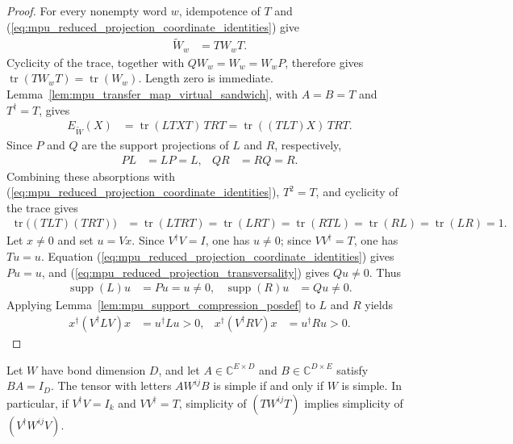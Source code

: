 \begin{proof}\leanok
    For every nonempty word $w$, idempotence of $T$ and
    (\ref{eq:mpu_reduced_projection_coordinate_identities}) give
    \begin{align}
        \widetilde W_w & =TW_wT.
    \end{align}
    Cyclicity of the trace, together with $QW_w=W_w=W_wP$, therefore gives
    $\operatorname{tr}(TW_wT)=\operatorname{tr}(W_w)$. Length zero is immediate.
    Lemma~\ref{lem:mpu_transfer_map_virtual_sandwich}, with $A=B=T$ and
    $T^\dagger=T$, gives
    \begin{align}
        E_{\widetilde W}(X)
         & =\operatorname{tr}(LTXT)\,TRT
        =\operatorname{tr}((TLT)X)\,TRT.
    \end{align}
    Since $P$ and $Q$ are the support projections of $L$ and $R$, respectively,
    \begin{align}
        PL & =LP=L, & QR & =RQ=R.
    \end{align}
    Combining these absorptions with
    (\ref{eq:mpu_reduced_projection_coordinate_identities}), $T^2=T$, and
    cyclicity of the trace gives
    \begin{align}
        \operatorname{tr}\!\bigl((TLT)(TRT)\bigr)
         & =\operatorname{tr}(LTRT)
        =\operatorname{tr}(LRT)
        =\operatorname{tr}(RTL)
        =\operatorname{tr}(RL)
        =\operatorname{tr}(LR)
        =1.
    \end{align}
    Let $x\neq0$ and set $u=Vx$. Since $V^\dagger V=I$, one has $u\neq0$;
    since $VV^\dagger=T$, one has $Tu=u$. Equation
    (\ref{eq:mpu_reduced_projection_coordinate_identities}) gives $Pu=u$, and
    (\ref{eq:mpu_reduced_projection_transversality}) gives $Qu\neq0$. Thus
    \begin{align}
        \operatorname{supp}(L)u & =Pu=u\neq0, &
        \operatorname{supp}(R)u & =Qu\neq0.
    \end{align}
    Applying Lemma~\ref{lem:mpu_support_compression_posdef} to $L$ and $R$ yields
    \begin{align}
        x^\dagger(V^\dagger LV)x & =u^\dagger Lu>0, &
        x^\dagger(V^\dagger RV)x & =u^\dagger Ru>0.
    \end{align}
\end{proof}

\begin{lemma}
    \label{thm:mpu_simple_rectangular_inclusion}
    \leanok
    Let $W$ have bond dimension $D$, and let
    $A\in\mathbb C^{E\times D}$ and $B\in\mathbb C^{D\times E}$ satisfy
    $BA=I_D$. The tensor with letters $AW^{ij}B$ is simple if and only if
    $W$ is simple. In particular, if $V^\dagger V=I_k$ and $VV^\dagger=T$,
    simplicity of $(TW^{ij}T)$ implies simplicity of $(V^\dagger W^{ij}V)$.
\end{lemma}

